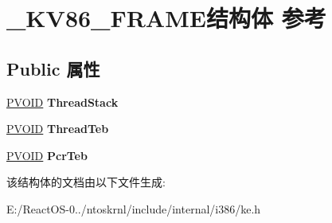 \hypertarget{struct___k_v86___f_r_a_m_e}{}\section{\+\_\+\+K\+V86\+\_\+\+F\+R\+A\+M\+E结构体 参考}
\label{struct___k_v86___f_r_a_m_e}
\subsection*{Public 属性}
\begin{DoxyCompactItemize}
\item 
\mbox{\label{struct___k_v86___f_r_a_m_e_ade70a52aa7210ca36354d79cd7112336}} 
\hyperlink{interfacevoid}{P\+V\+O\+ID} {\bfseries Thread\+Stack}
\item 
\mbox{\label{struct___k_v86___f_r_a_m_e_a3d8cc759c448ce94e960b23cb8e20e7e}} 
\hyperlink{interfacevoid}{P\+V\+O\+ID} {\bfseries Thread\+Teb}
\item 
\mbox{\label{struct___k_v86___f_r_a_m_e_abba54a2a1815227d16ef2c76c5641b6a}} 
\hyperlink{interfacevoid}{P\+V\+O\+ID} {\bfseries Pcr\+Teb}
\end{DoxyCompactItemize}


该结构体的文档由以下文件生成\+:\begin{DoxyCompactItemize}
\item 
E\+:/\+React\+O\+S-\/0../ntoskrnl/include/internal/i386/ke.\+h\end{DoxyCompactItemize}

